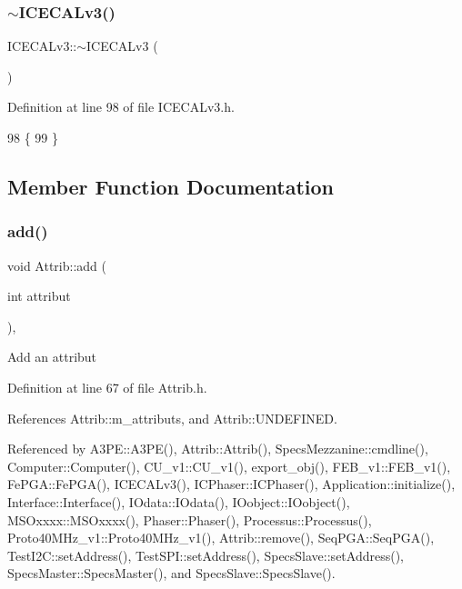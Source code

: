 \subsubsection{\texorpdfstring{$\sim$\+I\+C\+E\+C\+A\+Lv3()}{~ICECALv3()}}
{\footnotesize\ttfamily I\+C\+E\+C\+A\+Lv3\+::$\sim$\+I\+C\+E\+C\+A\+Lv3 (\begin{DoxyParamCaption}{ }\end{DoxyParamCaption})\hspace{0.3cm}{\ttfamily [inline]}}



Definition at line 98 of file I\+C\+E\+C\+A\+Lv3.\+h.


\begin{DoxyCode}
98              \{
99   \}
\end{DoxyCode}


\subsection{Member Function Documentation}
\mbox{\label{classAttrib_a235f773af19c900264a190b00a3b4ad7}} 
\subsubsection{\texorpdfstring{add()}{add()}}
{\footnotesize\ttfamily void Attrib\+::add (\begin{DoxyParamCaption}\item[{int}]{attribut }\end{DoxyParamCaption})\hspace{0.3cm}{\ttfamily [inline]}, {\ttfamily [inherited]}}

Add an attribut 

Definition at line 67 of file Attrib.\+h.



References Attrib\+::m\+\_\+attributs, and Attrib\+::\+U\+N\+D\+E\+F\+I\+N\+ED.



Referenced by A3\+P\+E\+::\+A3\+P\+E(), Attrib\+::\+Attrib(), Specs\+Mezzanine\+::cmdline(), Computer\+::\+Computer(), C\+U\+\_\+v1\+::\+C\+U\+\_\+v1(), export\+\_\+obj(), F\+E\+B\+\_\+v1\+::\+F\+E\+B\+\_\+v1(), Fe\+P\+G\+A\+::\+Fe\+P\+G\+A(), I\+C\+E\+C\+A\+Lv3(), I\+C\+Phaser\+::\+I\+C\+Phaser(), Application\+::initialize(), Interface\+::\+Interface(), I\+Odata\+::\+I\+Odata(), I\+Oobject\+::\+I\+Oobject(), M\+S\+Oxxxx\+::\+M\+S\+Oxxxx(), Phaser\+::\+Phaser(), Processus\+::\+Processus(), Proto40\+M\+Hz\+\_\+v1\+::\+Proto40\+M\+Hz\+\_\+v1(), Attrib\+::remove(), Seq\+P\+G\+A\+::\+Seq\+P\+G\+A(), Test\+I2\+C\+::set\+Address(), Test\+S\+P\+I\+::set\+Address(), Specs\+Slave\+::set\+Address(), Specs\+Master\+::\+Specs\+Master(), and Specs\+Slave\+::\+Specs\+Slave().


